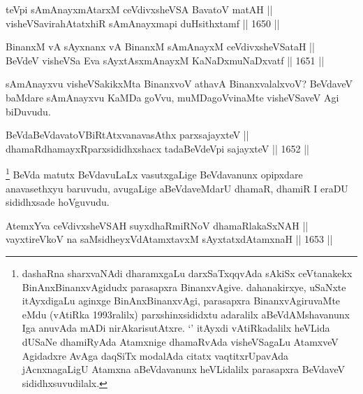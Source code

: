 \begin{shl}
teV\s pi sAmAnayxmAtarxM ceVdivxsheVSA BavatoV matAH || \\
visheVSavirahAtatxhiR sAmAnayxmapi duHsithxtamf ||  1650 ||  
\end{shl}


\begin{shl}
BinanxM vA sAyxnanx vA BinanxM sAmAnayxM ceVdivxsheVSataH ||  \\
BeVdeV visheVSa Eva sAyxtAsxmAnayxM KaNaDxmuNaDxvatf ||  1651 ||  
\end{shl}

\begin{artha}
sAmAnayxvu visheVSakikxMta BinanxvoV athavA BinanxvalalxvoV? BeVdaveV baMdare sAmAnayxvu KaMDa goVvu, muMDagoVvinaMte visheVSaveV Agi biDuvudu.
\end{artha}


\begin{shl}
BeVdaBeVdavatoVBiRtAtxvanavasAthx parxsajayxteV ||  \\
dhamaRdhamayxRparxsididhxshacx tadaBeVdeV\s pi sajayxteV ||  1652 || 
\end{shl}

\begin{artha}
\footnote{dashaRna sharxvaNAdi dharamxgaLu darxSaTxqqvAda sAkiSx ceVtanakekx BinAnxBinanxvAgidudx parasapxra BinanxvAgive. dahanakirxye, uSaNxte itAyxdigaLu aginxge BinAnxBinanxvAgi, parasapxra BinanxvAgiruvaMte eMdu (vAtiRka 1993ralilx) parxshinxsididxtu adaralilx aBeVdAMshavanunx Iga anuvAda mADi nirAkarisutAtxre. `\stext' itAyxdi vAtiRkadalilx heVLida dUSaNe dhamiRyAda Atamxnige dhamaRvAda visheVSagaLu AtamxveV Agidadxre AvAga daqSiTx modalAda citatx vaqtitxrUpavAda jAcnxnagaLigU Atamxna aBeVdavanunx heVLidalilx parasapxra BeVdaveV sididhxsuvudilalx.}
BeVda matutx BeVdavuLaLx vasutxgaLige BeVdavanunx opipxdare anavasethxyu baruvudu, avugaLige aBeVdaveMdarU dhamaR, dhamiR I eraDU sididhxsade hoVguvudu.
\end{artha}

\begin{shl}
AtemxYva ceVdivxsheVSAH suyxdhaRmiRNoV dhamaRlakaSxNAH ||  \\
vayxtireVkoV na saMsidheyxVdAtamxtavxM sAyxtatxdA\s \s tamxnaH ||  1653 ||  
\end{shl}

